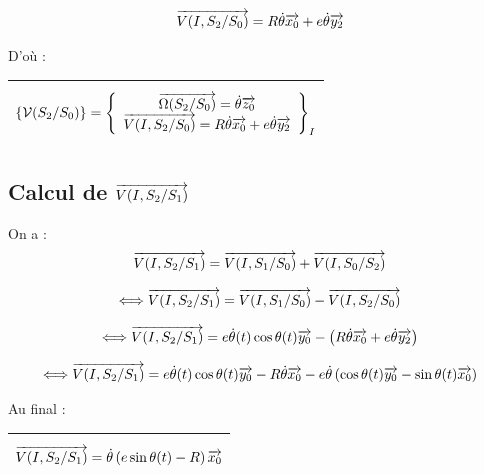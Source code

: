 \documentclass[11pt,oneside]{article}
\begin{document}
$$
\overrightarrow{V(I,S_2/S_0)} = R\dot{\theta}\overrightarrow{x_0} + e\dot{\theta}\overrightarrow{y_2}
$$

D'où :
\begin{center}
\begin{tabular}{|p{8cm}|}
\hline
$$
\{\mathcal{V}(S_2/S_0)\} =
\left\{
\begin{array}{c}
\overrightarrow{\Omega(S_2/S_0)} = \dot{\theta}\overrightarrow{z_0} \\
\overrightarrow{V(I,S_2/S_0)} = R\dot{\theta}\overrightarrow{x_0} + e\dot{\theta}\overrightarrow{y_2}  \\
\end{array}
\right\}_I
$$ \\
\hline
\end{tabular}
\end{center}
\subsection*{Calcul de $\overrightarrow{V(I,S_2/S_1)}$}
On a :
$$
\overrightarrow{V(I,S_2/S_1)} = \overrightarrow{V(I,S_1/S_0)} + \overrightarrow{V(I,S_0/S_2)}
$$

$$
\Longleftrightarrow \overrightarrow{V(I,S_2/S_1)} = \overrightarrow{V(I,S_1/S_0)} - \overrightarrow{V(I,S_2/S_0)}
$$

$$
\Longleftrightarrow \overrightarrow{V(I,S_2/S_1)} =  e \dot{\theta}(t) \cos \theta(t) \overrightarrow{y_0} - \left( R\dot{\theta}\overrightarrow{x_0} + e\dot{\theta}\overrightarrow{y_2} \right)
$$

$$
\Longleftrightarrow \overrightarrow{V(I,S_2/S_1)} = 
 e \dot{\theta}(t) \cos \theta(t) \overrightarrow{y_0} 
- R\dot{\theta}\overrightarrow{x_0} 
- e\dot{\theta}\left( \cos \theta(t) \overrightarrow{y_0}- \sin \theta(t) \overrightarrow{x_0} \right)
$$

Au final :
\begin{center}
\begin{tabular}{|p{8cm}|}
\hline
$$
\overrightarrow{V(I,S_2/S_1)} =  \dot{\theta}\left(e\sin \theta(t) - R\right)\overrightarrow{x_0} 
$$\\
\hline
\end{tabular}
\end{center}
\end{document}
